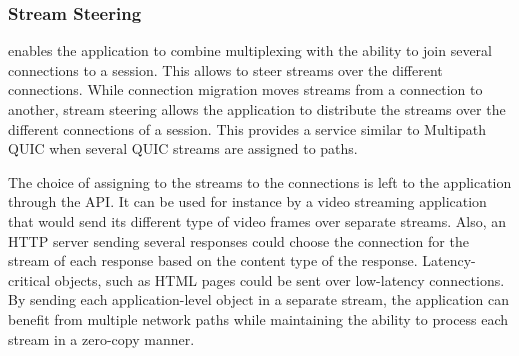 \subsubsection{Stream Steering}

\tcpls enables the application to combine multiplexing with the ability to join several \tcp connections to a \tcpls session. This allows to steer \tcpls streams over the different \tcp connections. While connection migration moves \tcpls streams from a connection to another, stream steering allows the application to distribute the streams over the different \tcp connections of a \tcpls session. This provides a service similar to Multipath QUIC  \cite{de2017multipath,draft-liu-multipath-quic-02} when several QUIC streams are assigned to paths.



The choice of assigning to the \tcpls streams to the \tcp connections is left to the application through the \tcpls API. It can be used for instance by a video streaming application that would send its different type of video frames over separate streams. 
Also, an HTTP server sending several responses could choose the \tcp connection for the stream of each response based on the content type of the response. Latency-critical objects, such as HTML pages could be sent over low-latency connections.
By sending each application-level object in a separate stream, the application can benefit from multiple network paths while maintaining the ability to process each stream in a zero-copy manner.


